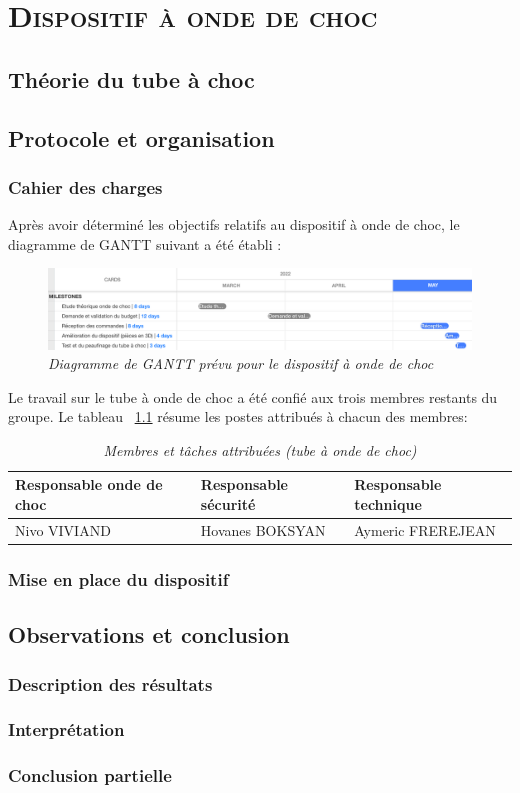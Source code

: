 \renewcommand{\chaptername}{\scshape Partie}
\chapter{\normalfont \scshape Dispositif à onde de choc}
\section{Théorie du tube à choc}
\section{Protocole et organisation}
\subsection{Cahier des charges}
Après avoir déterminé les objectifs relatifs au dispositif à onde de choc, le diagramme de GANTT suivant a été établi :
\begin{figure}[H]
	\includegraphics[scale = 0.4]{figures/gantt_choc.png}
	\caption{\small{\textit{Diagramme de GANTT prévu pour le dispositif à onde de choc}}}
	\label{gantt_choc}
\end{figure}
Le travail sur le tube à onde de choc a été confié aux trois membres restants du groupe. Le tableau ~\ref{gestion_choc} résume les postes attribués à chacun des membres:
\begin{table}[H]
	\centering
	\begin{tabular}{|l l l|}
		\hline
		\small\textbf{Responsable onde de choc}&\small\textbf{Responsable sécurité}&\small\textbf{Responsable technique}\\
		\hline
		\small{Nivo VIVIAND}&\small{Hovanes BOKSYAN}&\small{Aymeric FREREJEAN}\\
		\hline
	\end{tabular}
	\caption{\small\textit{Membres et tâches attribuées (tube à onde de choc)}}
	\label{gestion_choc}
\end{table}
\subsection{Mise en place du dispositif}
\section{Observations et conclusion}
\subsection{Description des résultats}
\subsection{Interprétation}
\subsection{Conclusion partielle}